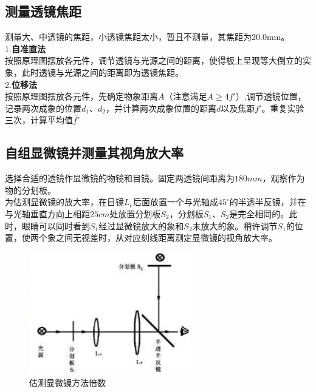 \documentclass{article}
\begin{document}
\subsection{测量透镜焦距}
\hspace*{2em}测量大、中透镜的焦距，小透镜焦距太小，暂且不测量，其焦距为20.0mm。\\
\hspace*{1em}1.\textbf{自准直法}\\
\hspace*{2em}按照原理图摆放各元件，调节透镜与光源之间的距离，使得板上呈现等大倒立的实象，此时透镜与光源之间的距离即为透镜焦距。\\
\hspace*{1em}2.\textbf{位移法}\\
\hspace*{2em}按照原理图摆放各元件，先确定物象距离$A$（注意满足$A\geq 4f'$）,调节透镜位置，记录两次成象的位置$d_1$、$d_2$，并计算两次成象位置的距离$d$以及焦距$f'$。重复实验三次，计算平均值$\overline{f'}$\\
\subsection{自组显微镜并测量其视角放大率}
\hspace*{2em}选择合适的透镜作显微镜的物镜和目镜。固定两透镜间距离为\(180mm\)，观察作为物的分划板。\\
\hspace*{2em}为估测显微镜的放大率，在目镜\(L_{e}\)后面放置一个与光轴成\(45^{\circ}\)的半透半反镜，并在与光轴垂直方向上相距\(25cm\)处放置分划板\(S_{2}\)，分划板\(S_{1}\)、\(S_{2}\)是完全相同的。此时，眼睛可以同时看到\(S_{1}\)经过显微镜放大的象和\(S_{2}\)未放大的象。稍许调节\(S_{1}\)的位置，使两个象之间无视差时，从对应刻线距离测定显微镜的视角放大率。
\begin{figure}[h]
    \centering
    \includegraphics[width=7cm]{2.4.1.png} %
    \caption{估测显微镜方法倍数}
\end{figure}
\end{document}
